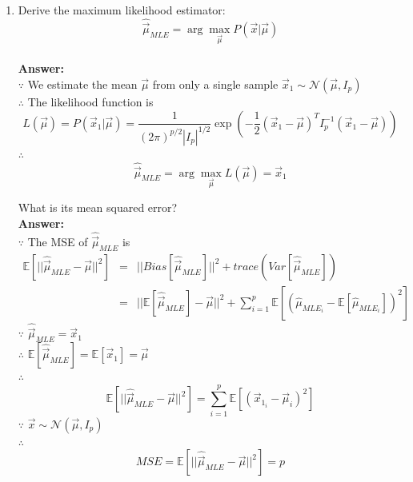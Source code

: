 \documentclass{article}
\begin{document}
\begin{enumerate}
	\item Derive the maximum likelihood estimator:
	$$\hat{\vec{\mu}}_{MLE}=\arg\max_{\vec{\mu}} P(\vec{x}|\vec{\mu})$$
	\\\textbf{Answer:}\\
	$\because$ We estimate the mean $\vec{\mu}$ from only a single sample $\vec{x}_1 \sim \mathcal{N}(\vec{\mu},I_p)$ \\
	$\therefore$ The likelihood function is $$L(\vec{\mu})=P(\vec{x}_1|\vec{\mu})=\frac{1}{(2\pi)^{p/2}|I_p|^{1/2}}\exp(-\frac{1}{2}(\vec{x}_1-\vec{\mu})^TI_p^{-1}(\vec{x}_1-\vec{\mu}))$$
	$\therefore$
	$$\hat{\vec{\mu}}_{MLE}=\arg\max_{\vec{\mu}}L(\vec{\mu})=\vec{x}_1$$
	
	What is its mean squared error?
	\\\textbf{Answer:}\\
	$\because$ The MSE of $\hat{\vec{\mu}}_{MLE}$ is
	\begin{equation}
	\nonumber
	\begin{array}{rcl}
		\mathbb{E}[||\hat{\vec{\mu}}_{MLE}-\vec{\mu}||^2] & = & ||Bias[\hat{\vec{\mu}}_{MLE}]||^2 + trace(Var[\hat{\vec{\mu}}_{MLE}]) \\
		& = & ||\mathbb{E}[\hat{\vec{\mu}}_{MLE}]-\vec{\mu}||^2 + \sum_{i=1}^{p}{\mathbb{E}[(\hat{\mu}_{MLE_i}-\mathbb{E}[\hat{\mu}_{MLE_i}])^2]}
	\end{array}
	\end{equation}
	$\because$ $\hat{\vec{\mu}}_{MLE}=\vec{x}_1$\\
	$\therefore$ $\mathbb{E}[\hat{\vec{\mu}}_{MLE}]=\mathbb{E}[\vec{x}_1]=\vec{\mu}$\\
	$\therefore$ $$\mathbb{E}[||\hat{\vec{\mu}}_{MLE}-\vec{\mu}||^2]=\sum_{i=1}^{p}{\mathbb{E}[(\vec{x}_{1_i}-\vec{\mu}_i)^2]}$$
	$\because$ $\vec{x}\sim\mathcal{N}(\vec{\mu},I_p)$\\
	$\therefore$ $$MSE=\mathbb{E}[||\hat{\vec{\mu}}_{MLE}-\vec{\mu}||^2]=p$$
	

\end{enumerate}
\end{document}
